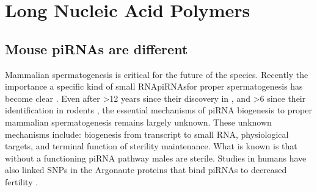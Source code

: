 
 \section{Long Nucleic Acid Polymers}\label{piRNA section}
\subsection{Mouse piRNAs are different}\label{sec:Mouse piRNAs}


Mammalian spermatogenesis is critical for the future of the species. Recently the importance a specific kind of small RNA\textemdash piRNAs\textemdash for proper spermatogenesis has become clear \citep{Siomi2011}. Even after >12 years since their discovery in \flies \citep{Aravin2001}, and >6 since their identification in rodents \citep{Girard2006, Lau2006}, the essential mechanisms of piRNA biogenesis to proper mammalian spermatogenesis remains largely unknown. These unknown mechanisms include: biogenesis from transcript to small RNA, physiological targets, and terminal function of sterility maintenance. What is known is that without a functioning piRNA pathway males are sterile. Studies in humans have also linked SNPs in the Argonaute proteins that bind piRNAs to decreased fertility \citep{Gu2010a}. 

